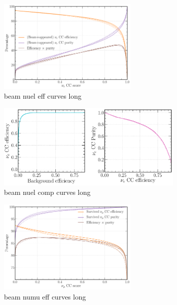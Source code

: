 \begin{figure} %
    \includegraphics[width=0.6\textwidth]{diagrams/7-cvn/chipsnet/beam_nuel_eff_curves.pdf}
    \caption[beam nuel eff curves short]
    {beam nuel eff curves long}
    \label{fig:beam_nuel_eff_curves}
\end{figure}

\begin{figure} %
    \includegraphics[width=0.8\textwidth]{diagrams/7-cvn/chipsnet/beam_nuel_comp_curves.pdf}
    \caption[beam nuel comp curves short]
    {beam nuel comp curves long}
    \label{fig:beam_nuel_comp_curves}
\end{figure}

\begin{figure} %
    \includegraphics[width=0.6\textwidth]{diagrams/7-cvn/chipsnet/beam_numu_eff_curves.pdf}
    \caption[beam numu eff curves short]
    {beam numu eff curves long}
    \label{fig:beam_numu_eff_curves}
\end{figure}

